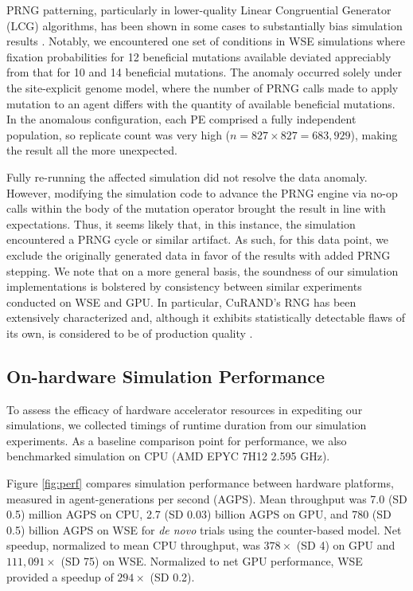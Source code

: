 PRNG patterning, particularly in lower-quality Linear Congruential Generator (LCG) algorithms, has been shown in some cases to substantially bias simulation results \citep{click2010quality}.
Notably, we encountered one set of conditions in WSE simulations where fixation probabilities for 12 beneficial mutations available deviated appreciably from that for 10 and 14 beneficial mutations.
The anomaly occurred solely under the site-explicit genome model, where the number of PRNG calls made to apply mutation to an agent differs with the quantity of available beneficial mutations.
In the anomalous configuration, each PE comprised a fully independent population, so replicate count was very high ($n = 827 \times 827 = 683,929$), making the result all the more unexpected.

Fully re-running the affected simulation did not resolve the data anomaly.
However, modifying the simulation code to advance the PRNG engine via no-op calls within the body of the mutation operator brought the result in line with expectations.
Thus, it seems likely that, in this instance, the simulation encountered a PRNG cycle or similar artifact.
As such, for this data point, we exclude the originally generated data in favor of the results with added PRNG stepping.
We note that on a more general basis, the soundness of our simulation implementations is bolstered by consistency between similar experiments conducted on WSE and GPU.
In particular, CuRAND's RNG has been extensively characterized and, although it exhibits statistically detectable flaws of its own, is considered to be of production quality \citep{nvidia2024curand}.

\subsection{On-hardware Simulation Performance}
\label{sec:performance}



To assess the efficacy of hardware accelerator resources in expediting our simulations, we collected timings of runtime duration from our simulation experiments.
As a baseline comparison point for performance, we also benchmarked simulation on CPU (AMD EPYC 7H12 2.595 GHz).

Figure \ref{fig:perf} compares simulation performance between hardware platforms, measured in agent-generations per second (AGPS).
Mean throughput was 7.0 (SD 0.5) million AGPS on CPU, 2.7 (SD 0.03) billion AGPS on GPU, and 780 (SD 0.5) billion AGPS on WSE for \textit{de novo} trials using the counter-based model.
Net speedup, normalized to mean CPU throughput, was $378\times$ (SD 4) on GPU and $111,091\times$ (SD 75) on WSE.
Normalized to net GPU performance, WSE provided a speedup of $294\times$ (SD 0.2).


